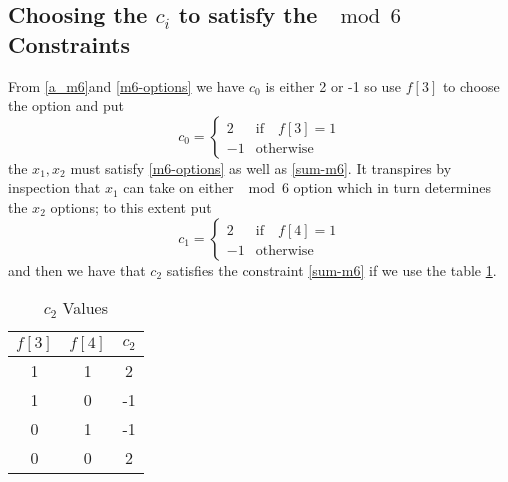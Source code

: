 \documentclass[a4paper,oneside,english]{article}
\numberwithin{equation}{section}
\numberwithin{figure}{section}
\numberwithin{table}{section}
\begin{document}
\subsection{Choosing the $c_i$ to satisfy the $\mod 6$ Constraints}
From \ref{a_m6}and \ref{m6-options} we have $c_0$ is either 2 or -1 so use $f[3]$ to choose the option and put
\begin{equation}\label{c-0}
c_0=\begin{cases}
2 & \mathrm{if}\quad  f[3] = 1\\
-1 & \mathrm{otherwise}
\end{cases}
\end{equation} 
the $x_1,x_2$ must satisfy \ref{m6-options} as well as \ref{sum-m6}. It transpires by inspection that $x_1$ can take on either $\mod 6$ option which in turn determines the $x_2$ options; to this extent put
\begin{equation}\label{c-0}
c_1=\begin{cases}
2 & \mathrm{if}\quad  f[4] = 1\\
-1 & \mathrm{otherwise}
\end{cases}
\end{equation} 
and then we have that $c_2$ satisfies the constraint \ref{sum-m6} if we use the table \ref{c2-values}.
\begin{table}[h]	\caption{\label{c2-values}$c_2$ Values}
	\begin{center}
	\begin{tabular}{|cc||c|}
	\hline
	$f[3]$&$f[4]$&$c_2$ \\
	\hline\hline
	1&1&2\\
	1&0&-1\\
	0&1&-1\\
	0&0&2\\
	\hline
\end{tabular}
\end{center}
\end{table}
 
\end{document}
